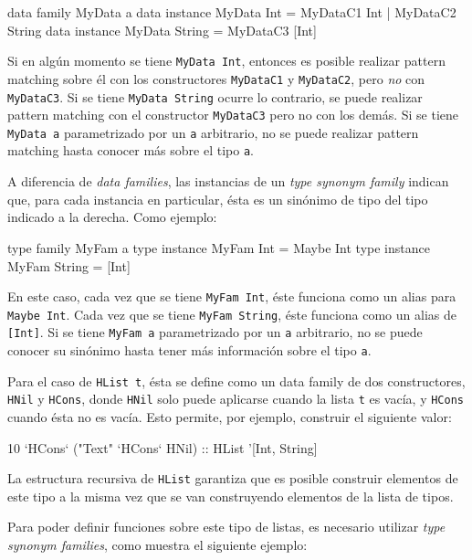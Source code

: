 \begin{code}
data family MyData a
data instance MyData Int = 
  MyDataC1 Int | MyDataC2 String
data instance MyData String = MyDataC3 [Int]
\end{code}

Si en algún momento se tiene \texttt{MyData Int}, entonces es posible realizar pattern matching sobre él con los constructores \texttt{MyDataC1} y \texttt{MyDataC2}, pero \textit{no} con \texttt{MyDataC3}. Si se tiene \texttt{MyData String} ocurre lo contrario, se puede realizar pattern matching con el constructor \texttt{MyDataC3} pero no con los demás. Si se tiene \texttt{MyData a} parametrizado por un \texttt{a} arbitrario, no se puede realizar pattern matching hasta conocer más sobre el tipo \texttt{a}.

A diferencia de \textit{data families}, las instancias de un \textit{type synonym family} indican que, para cada instancia en particular, ésta es un sinónimo de tipo del tipo indicado a la derecha. Como ejemplo:

\begin{code}
type family MyFam a
type instance MyFam Int = Maybe Int
type instance MyFam String = [Int]
\end{code}

En este caso, cada vez que se tiene \texttt{MyFam Int}, éste funciona como un alias para \texttt{Maybe Int}. Cada vez que se tiene \texttt{MyFam String}, éste funciona como un alias de \texttt{[Int]}. Si se tiene \texttt{MyFam a} parametrizado por un \texttt{a} arbitrario, no se puede conocer su sinónimo hasta tener más información sobre el tipo \texttt{a}.

Para el caso de \texttt{HList t}, ésta se define como un data family de dos constructores, \texttt{HNil} y \texttt{HCons}, donde \texttt{HNil} solo puede aplicarse cuando la lista \texttt{t} es vacía, y \texttt{HCons} cuando ésta no es vacía. Esto permite, por ejemplo, construir el siguiente valor:

\begin{code}
10 `HCons` ("Text" `HCons` HNil) :: HList '[Int, String]
\end{code}

La estructura recursiva de \texttt{HList} garantiza que es posible construir elementos de este tipo a la misma vez que se van construyendo elementos de la lista de tipos.

Para poder definir funciones sobre este tipo de listas, es necesario utilizar \textit{type synonym families}, como muestra el siguiente ejemplo:

